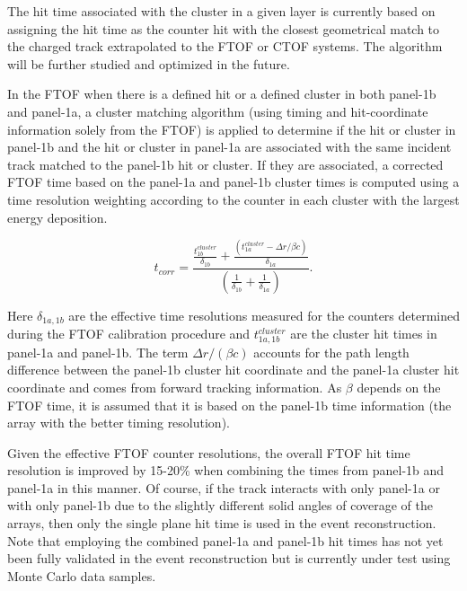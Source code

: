 The hit time associated with the cluster in a given layer is currently based on assigning the hit time as the
counter hit with the closest geometrical match to the charged track extrapolated to the FTOF or CTOF
systems. The algorithm will be further studied and optimized in the future.

In the FTOF when there is a defined hit or a defined cluster in both panel-1b and panel-1a, a cluster matching
algorithm (using timing and hit-coordinate information solely from the FTOF) is applied to determine if the hit
or cluster in panel-1b and the hit or cluster in panel-1a are associated with the same incident track matched to
the panel-1b hit or cluster. If they are associated, a corrected FTOF time based on the panel-1a and panel-1b
cluster times is computed using a time resolution weighting according to the counter in each cluster with the
largest energy deposition.

\begin{equation}
  t_{corr} = \frac{\displaystyle \frac{\displaystyle t_{1b}^{cluster}}{\displaystyle \delta_{1b}} +
    \frac{\displaystyle (t_{1a}^{cluster} - \Delta r/\beta c)}{\displaystyle \delta_{1a}}}
  {\displaystyle \left( \frac{\displaystyle 1}{\displaystyle \delta_{1b}} +
    \frac{\displaystyle 1}{\displaystyle \delta_{1a}} \right)}.
\end{equation}

\noindent
Here $\delta_{1a,1b}$ are the effective time resolutions measured for the counters determined during the
FTOF calibration procedure and $t_{1a,1b}^{cluster}$ are the cluster hit times in panel-1a and panel-1b. The term
$\Delta r/(\beta c)$ accounts for the path length difference between the panel-1b cluster hit coordinate and
the panel-1a cluster hit coordinate and comes from forward tracking information. As $\beta$ depends on the
FTOF time, it is assumed that it is based on the panel-1b time information (the array with the better timing
resolution).

Given the effective FTOF counter resolutions, the overall FTOF hit time resolution is improved by 15-20\%
when combining the times from panel-1b and panel-1a in this manner. Of course, if the track interacts with only
panel-1a or with only panel-1b due to the slightly different solid angles of coverage of the arrays, then only the
single plane hit time is used in the event reconstruction. Note that employing the combined panel-1a and panel-1b
hit times has not yet been fully validated in the event reconstruction but is currently under test using Monte
Carlo data samples.
